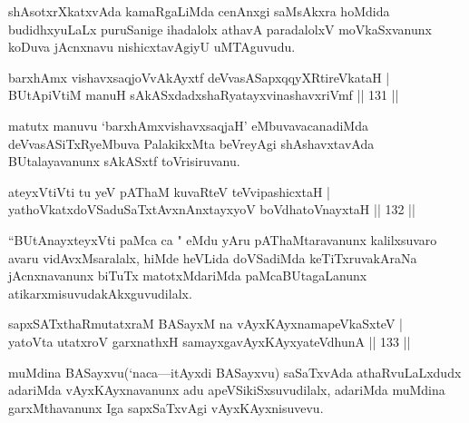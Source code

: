 \begin{artha}
shAsotxrXkatxvAda kamaRgaLiMda cenAnxgi saMsAkxra hoMdida budidhxyuLaLx puruSanige ihadalolx athavA paradalolxV moVkaSxvanunx koDuva jAcnxnavu nishicxtavAgiyU uMTAguvudu.
\end{artha}

\begin{shl}
\footnotemark{}barxhAmx vishavxsaqjoVvAkAyxtf \footnotemark{}deVvasASapxqqyXRtireVkataH |\\
\footnotemark{}BUtApiVtiM manuH sAkASxdadxshaRyatayxvinashavxriVmf \hfill || 131 ||
\end{shl}

\begin{artha}
matutx manuvu `barxhAmxvishavxsaqjaH' eMbuvavacanadiMda deVvasASiTxRyeMbuva PalakikxMta beVreyAgi shAshavxtavAda BUtalayavanunx sAkASxtf toVrisiruvanu.
\end{artha}

\begin{shl}
ateyxVtiVti tu yeV pAThaM kuvaRteV teV\s vipashicxtaH |\\
yathoVkatxdoVSaduSaTxtAvxnAnxtayxyoV boVdhatoV\s nayxtaH \hfill || 132 ||
\end{shl}

\begin{artha}
``BUtAnayxteyxVti paMca ca " eMdu yAru pAThaMtaravanunx kalilxsuvaro avaru vidAvxMsaralalx, hiMde heVLida doVSadiMda keTiTxruvakAraNa jAcnxnavanunx biTuTx matotxMdariMda paMcaBUtagaLanunx atikarxmisuvudakAkxguvudilalx.
\end{artha}

\begin{shl}
sapxSATxthaRmutatxraM BASayxM na vAyxKAyxnamapeVkaSxteV |\\
yatoV\s ta utatxroV garxnathxH samayxgavAyxKAyxyateV\s dhunA \hfill || 133 ||
\end{shl}

\begin{artha}
muMdina BASayxvu(`naca---itAyxdi BASayxvu) saSaTxvAda athaRvuLaLxdudx adariMda vAyxKAyxnavanunx adu apeVSikiSxsuvudilalx, adariMda muMdina garxMthavanunx Iga sapxSaTxvAgi vAyxKAyxnisuvevu.
\end{artha}

